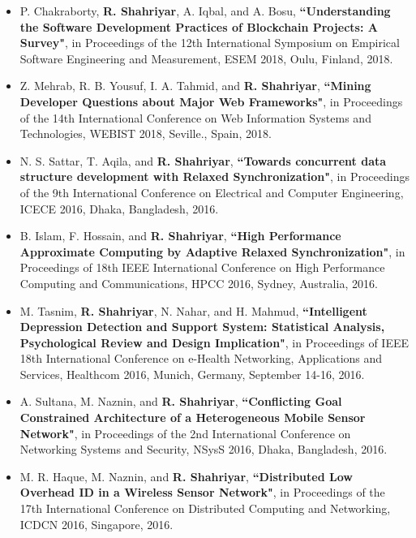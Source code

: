 \documentclass[letterpaper,11pt]{article}
\begin{document}
\begin{itemize}
\item P. Chakraborty, {\bf R. Shahriyar}, A. Iqbal, and A. Bosu, {\color{black} \bf
    ``Understanding the Software Development Practices of Blockchain Projects: A Survey"}, in Proceedings of the 12th International Symposium on Empirical Software Engineering and Measurement, ESEM 2018, Oulu, Finland, 2018.

\item Z. Mehrab, R. B. Yousuf, I. A. Tahmid, and {\bf R. Shahriyar}, {\color{black} \bf
    ``Mining Developer Questions about Major Web Frameworks"}, in Proceedings of the 14th International Conference on Web Information Systems and Technologies, WEBIST 2018, Seville., Spain, 2018.

\item N. S. Sattar, T. Aqila, and {\bf R. Shahriyar}, {\color{black} \bf
    ``Towards concurrent data structure development with Relaxed Synchronization"}, in Proceedings of the 9th International Conference on Electrical and Computer Engineering, ICECE 2016, Dhaka, Bangladesh, 2016.

\item B. Islam, F. Hossain, and {\bf R. Shahriyar}, {\color{black} \bf
    ``High Performance Approximate Computing by Adaptive Relaxed Synchronization"}, in Proceedings of 18th IEEE International Conference on High Performance Computing and Communications, HPCC 2016, Sydney, Australia, 2016.
        
\item M. Tasnim, {\bf R. Shahriyar}, N. Nahar, and H. Mahmud,  {\color{black} \bf
    ``Intelligent Depression Detection and Support System: Statistical Analysis, Psychological Review and Design Implication"}, in Proceedings of IEEE 18th International Conference on e-Health Networking, Applications and Services, Healthcom 2016, Munich, Germany, September 14-16, 2016.     

\item A. Sultana, M. Naznin, and {\bf R. Shahriyar}, {\color{black} \bf
    ``Conflicting Goal Constrained Architecture of a Heterogeneous Mobile Sensor Network"}, in Proceedings of the 2nd International Conference on Networking Systems and Security, NSysS 2016, Dhaka, Bangladesh, 2016.

\item M. R. Haque, M. Naznin, and {\bf R. Shahriyar}, {\color{black} \bf
    ``Distributed Low Overhead ID in a Wireless Sensor Network"}, in Proceedings of the 17th International Conference on Distributed Computing and Networking, ICDCN 2016, Singapore, 2016.


\end{itemize}
\end{document}
